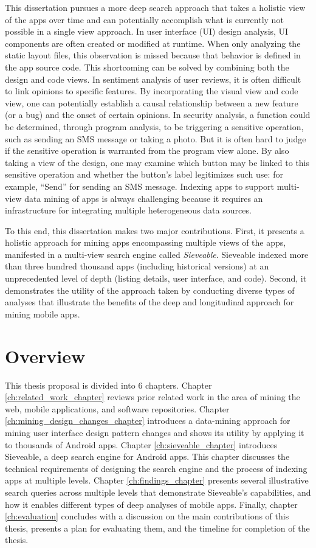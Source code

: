 This dissertation pursues a more deep search approach that takes a holistic view of the apps over time and can potentially accomplish what is currently not possible in a single view approach.
In user interface (UI) design analysis, UI components are often created or modified at runtime.
When only analyzing the static layout files, this observation is missed because that behavior is defined in the app source code.
This shortcoming can be solved by combining both the design and code views.
In sentiment analysis of user reviews, it is often difficult to link opinions to specific features.
By incorporating the visual view and code view, one can potentially establish a causal relationship between a new feature (or a bug) and the onset of certain opinions.
In security analysis, a function could be determined, through program analysis, to be triggering a sensitive operation, such as sending an SMS message or taking a photo.
But it is often hard to judge if the sensitive operation is warranted from the program view alone.
By also taking a view of the design, one may examine which button may be linked to this sensitive operation and whether the button's label legitimizes such use: for example, ``Send'' for sending an SMS message.
Indexing apps to support multi-view data mining of apps is always challenging because it requires an infrastructure for integrating multiple heterogeneous data sources.

To this end, this dissertation makes two major contributions.
First, it presents a holistic approach for mining apps encompassing multiple views of the apps, manifested in a multi-view search engine called \textit{Sieveable}.
Sieveable indexed more than three hundred thousand apps (including historical versions) at an unprecedented level of depth (listing details, user interface, and code).
Second, it demonstrates the utility of the approach taken by conducting diverse types of analyses that illustrate the benefits of the deep and longitudinal approach for mining mobile apps.

\section{Overview}
This thesis proposal is divided into 6 chapters.
Chapter \ref{ch:related_work_chapter} reviews prior related work in the area of mining the web, mobile applications, and software repositories.
Chapter \ref{ch:mining_design_changes_chapter} introduces a data-mining approach for mining user interface design pattern changes and shows its utility by applying it to thousands of Android apps.
Chapter \ref{ch:sieveable_chapter} introduces Sieveable, a deep search engine for Android apps. 
This chapter discusses the technical requirements of designing the search engine and the process of indexing apps at multiple levels.
Chapter \ref{ch:findings_chapter} presents several illustrative search queries across multiple levels that demonstrate Sieveable's capabilities, and how it enables different types of deep analyses of mobile apps.
Finally, chapter \ref{ch:evaluation} concludes with a discussion on the main contributions of this thesis, presents a plan for evaluating them, and the timeline for completion of the thesis.
